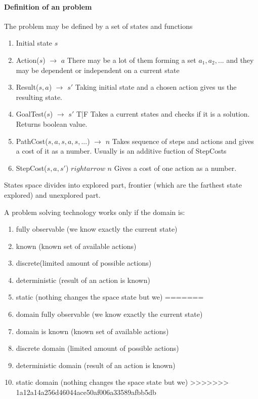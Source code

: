 \documentclass[a4paper,10pt]{article}
\begin{document}
\paragraph{Definition of an problem}
The problem may be defined by a set of states and functions
\begin{enumerate}
  \item Initial state $s$
  \item Action($s$) $\rightarrow$ $a$ There may be a lot of them forming a set ${a_1, a_2, ...}$ and they may be dependent or independent on a current state
  \item Result($s,a$) $\rightarrow$ $s'$ Taking initial state and a chosen action gives us the resulting state.
  \item GoalTest($s$) $\rightarrow$ $s'$ T|F Takes a current states and checks if it is a solution. Returns boolean value.
  \item PathCost($s,a,s,a,s,...$) $\rightarrow$ $n$ Takes sequence of steps and actions and gives a cost of it as a number. Usually is an additive fuction of StepCosts
  \item StepCost($s,a,s'$) $rightarrow$ $n$ Gives a cost of one action as a number.
\end{enumerate}

States space divides into explored part, frontier (which are the farthest state explored) and unexplored part.

A problem solving technology works only if the domain is:
\begin{enumerate}
<<<<<<< HEAD
 \item fully observable (we know exactly the current state)
 \item known (known set of available actions)
 \item discrete(limited amount of possible actions)
 \item deterministic (result of an action is known)
 \item static (nothing changes the space state but we)
=======
 \item domain fully observable (we know exactly the current state)
 \item domain is known (known set of available actions)
 \item discrete domain (limited amount of possible actions)
 \item deterministic domain (result of an action is known)
 \item static domain (nothing changes the space state but we)
>>>>>>> 1a12a14a256d46044ace50af006a33589afbb5db
\end{enumerate}
\end{document}
